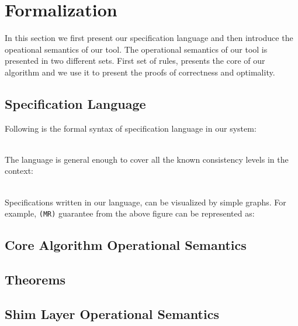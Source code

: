 \section{Formalization}
In this section we first present our specification language and then
introduce the opeational semantics of our tool. The operational semantics of our tool is presented in two different sets. First set of rules, presents the core of our algorithm and we use it to present the proofs of correctness and optimality. 

\subsection{Specification Language}
Following is the formal syntax of specification language in our system:

\\ The language is general enough to cover all  the known consistency
levels in the context:

\\ Specifications written in our language, can be visualized by simple graphs. For example, \texttt{(MR)} guarantee from the above figure can be represented as:



\subsection{Core Algorithm Operational Semantics}


\subsection{Theorems}



\subsection{Shim Layer Operational Semantics}





